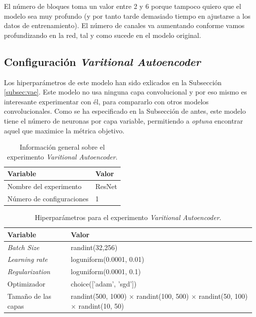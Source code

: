 El número de bloques toma un valor entre 2 y 6 porque tampoco quiero que el modelo sea muy profundo (y por tanto tarde demasiado tiempo en ajustarse a los datos de entrenamiento). El número de canales va aumentando conforme vamos profundizando en la red, tal y como sucede en el modelo original.

\subsection{Configuración \textit{Varitional Autoencoder}}

Los hiperparámetros de este modelo han sido exlicados en la Subsección \ref{subsec:vae}. Este modelo no usa ninguna capa convolucional y por eso mismo es interesante experimentar con él, para compararlo con otros modelos convolucionales. Como se ha especificado en la Subsección de antes, este modelo tiene el número de neuronas por capa variable, permitiendo a \textit{optuna} encontrar aquel que maximice la métrica objetivo.\\

\begin{table}[H]
\centering
\begin{tabular}[c]{m{6cm}m{3cm}}
\hline
\textbf{Variable}                 & \textbf{Valor}  \\ \hline
Nombre del experimento            & ResNet          \\
Número de configuraciones         & 1               \\ \hline
\end{tabular}
\caption{Información general sobre el experimento \textit{Varitional Autoencoder}.}
\label{tab:resnetinfo}
\end{table}

\begin{table}[H]
\centering
\begin{tabular}{m{3cm}m{7cm}}
\hline
\textbf{Variable}                 & \textbf{Valor}                          \\ \hline
\textit{Batch Size}               & randint(32,256)                         \\
\textit{Learning rate}            & loguniform(0.0001, 0.01)                \\
\textit{Regularization}           & loguniform(0.0001, 0.1)                 \\
Optimizador                       & choice(['adam', 'sgd'])                 \\ 
Tamaño de las capas               & randint(500, 1000) $\times$ randint(100, 500) $\times$ randint(50, 100) $\times$ randint(10, 50) \\
\hline
\end{tabular}
\caption{Hiperparámetros para el experimento \textit{Varitional Autoencoder}.}
\label{tab:resnetconfig}
\end{table}

